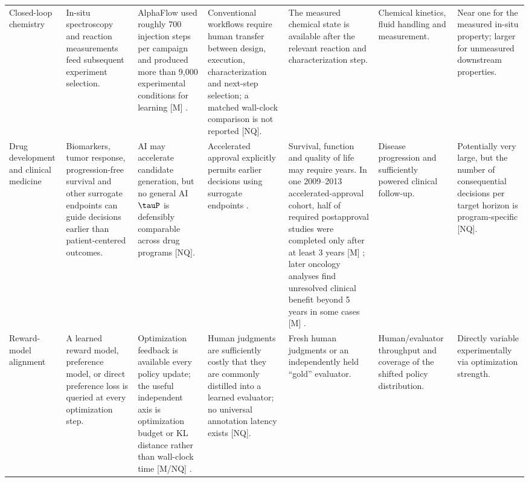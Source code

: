 \begin{landscape}
\begin{center}
\begin{longtable}{
    @{}
    p{2.0cm}
    p{3.0cm}
    p{2.85cm}
    p{2.75cm}
    p{3.05cm}
    p{2.75cm}
    p{2.55cm}
    @{}
}
Closed-loop chemistry
&
In-situ spectroscopy and reaction measurements feed subsequent
experiment selection.
&
AlphaFlow used roughly 700 injection steps per campaign and produced
more than 9,000 experimental conditions for learning [M]
\parencite{volk2023alphaflow}.
&
Conventional workflows require human transfer between design,
execution, characterization and next-step selection; a matched
wall-clock comparison is not reported [NQ].
&
The measured chemical state is available after the relevant reaction
and characterization step.
&
Chemical kinetics, fluid handling and measurement.
&
Near one for the measured in-situ property; larger for unmeasured
downstream properties.

\\[3pt]

Drug development and clinical medicine
&
Biomarkers, tumor response, progression-free survival and other
surrogate endpoints can guide decisions earlier than patient-centered
outcomes.
&
AI may accelerate candidate generation, but no general AI
$\tauP$ is defensibly comparable across drug programs [NQ].
&
Accelerated approval explicitly permits earlier decisions using
surrogate endpoints \parencite{fdaAccelerated,gyawali2019accelerated}.
&
Survival, function and quality of life may require years.  In one
2009--2013 accelerated-approval cohort, half of required postapproval
studies were completed only after at least 3 years [M]
\parencite{naci2017accelerated}; later oncology analyses find unresolved
clinical benefit beyond 5 years in some cases [M]
\parencite{liu2024clinicalbenefit}.
&
Disease progression and sufficiently powered clinical follow-up.
&
Potentially very large, but the number of consequential decisions per
target horizon is program-specific [NQ].

\\[3pt]

Reward-model alignment
&
A learned reward model, preference model, or direct preference loss is
queried at every optimization step.
&
Optimization feedback is available every policy update; the useful
independent axis is optimization budget or KL distance rather than
wall-clock time [M/NQ]
\parencite{gao2022overoptimization,rafailov2024direct}.
&
Human judgments are sufficiently costly that they are commonly
distilled into a learned evaluator; no universal annotation latency
exists [NQ].
&
Fresh human judgments or an independently held ``gold'' evaluator.
&
Human/evaluator throughput and coverage of the shifted policy
distribution.
&
Directly variable experimentally via optimization strength.


\end{longtable}
\end{center}
\end{landscape}
